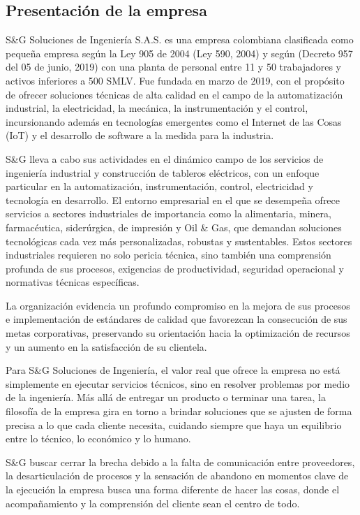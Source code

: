 \subsection{Presentación de la empresa}

S\&G Soluciones de Ingeniería S.A.S. es una empresa colombiana clasificada como pequeña empresa según la Ley 905 de 2004 (Ley 590, 2004) y según (Decreto 957 del 05 de junio, 2019) con una planta de personal entre 11 y 50 trabajadores y activos inferiores a 500 SMLV. Fue fundada en marzo de 2019, con el propósito de ofrecer soluciones técnicas de alta calidad en el campo de la automatización industrial, la electricidad, la mecánica, la instrumentación y el control, incursionando además en tecnologías emergentes como el Internet de las Cosas (IoT) y el desarrollo de software a la medida para la industria. \parencite{anifcentrodeestudioseconomicosRetos2021}

S\&G lleva a cabo sus actividades en el dinámico campo de los servicios de ingeniería industrial y construcción de tableros eléctricos, con un enfoque particular en la automatización, instrumentación, control, electricidad y tecnología en desarrollo. El entorno empresarial en el que se desempeña ofrece servicios a sectores industriales de importancia como la alimentaria, minera, farmacéutica, siderúrgica, de impresión y Oil \& Gas, que demandan soluciones tecnológicas cada vez más personalizadas, robustas y sustentables. Estos sectores industriales requieren no solo pericia técnica, sino también una comprensión profunda de sus procesos, exigencias de productividad, seguridad operacional y normativas técnicas específicas. 

La organización evidencia un profundo compromiso en la mejora de sus procesos e implementación de estándares de calidad que favorezcan la consecución de sus metas corporativas, preservando su orientación hacia la optimización de recursos y un aumento en la satisfacción de su clientela.

Para S\&G Soluciones de Ingeniería, el valor real que ofrece la empresa no está simplemente en ejecutar servicios técnicos, sino en resolver problemas por medio de la ingeniería. Más allá de entregar un producto o terminar una tarea, la filosofía de la empresa gira en torno a brindar soluciones que se ajusten de forma precisa a lo que cada cliente necesita, cuidando siempre que haya un equilibrio entre lo técnico, lo económico y lo humano.

S\&G buscar cerrar la brecha debido a la falta de comunicación entre proveedores, la desarticulación de procesos y la sensación de abandono en momentos clave de la ejecución la empresa busca una forma diferente de hacer las cosas, donde el acompañamiento y la comprensión del cliente sean el centro de todo.

